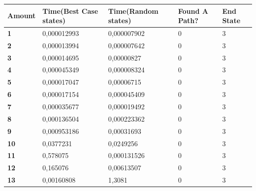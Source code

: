 \documentclass[a4paper]{article}
\begin{document}
\begin{table}[H]
\centering
\label{recursive-table}
\begin{tabular}{|l|l|l|l|l|}
\hline
\textbf{Amount} & \textbf{Time(Best Case states)} & \textbf{Time(Random states)} & \textbf{Found A Path?} & \textbf{End State} \\ \hline
\textbf{1}      & 0,000012993                     & 0,000007902                  & 0                      & 3                  \\ \hline
\textbf{2}      & 0,000013994                     & 0,000007642                  & 0                      & 3                  \\ \hline
\textbf{3}      & 0,000014695                     & 0,00000827                   & 0                      & 3                  \\ \hline
\textbf{4}      & 0,000045349                     & 0,000008324                  & 0                      & 3                  \\ \hline
\textbf{5}      & 0,000017047                     & 0,00006715                   & 0                      & 3                  \\ \hline
\textbf{6}      & 0,000017154                     & 0,000045409                  & 0                      & 3                  \\ \hline
\textbf{7}      & 0,000035677                     & 0,000019492                  & 0                      & 3                  \\ \hline
\textbf{8}      & 0,000136504                     & 0,000223362                  & 0                      & 3                  \\ \hline
\textbf{9}      & 0,000953186                     & 0,00031693                   & 0                      & 3                  \\ \hline
\textbf{10}     & 0,0377231                       & 0,0249256                    & 0                      & 3                  \\ \hline
\textbf{11}     & 0,578075                        & 0,000131526                  & 0                      & 3                  \\ \hline
\textbf{12}     & 0,165076                        & 0,00613507                   & 0                      & 3                  \\ \hline
\textbf{13}     & 0,00160808                      & 1,3081                       & 0                      & 3                  \\ \hline

\end{tabular}
\end{table}
\end{document}
